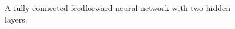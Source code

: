 \begin{center}
	\begin{figure}[ht]
		\caption{A fully-connected feedforward neural network with two hidden layers.}
	\end{figure}
\end{center}
